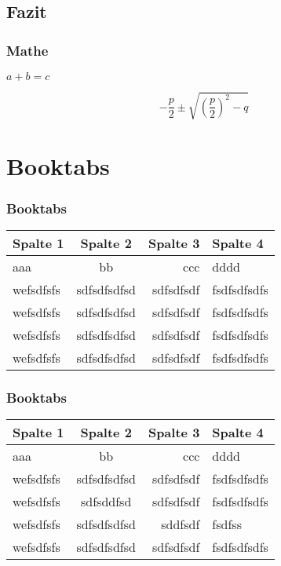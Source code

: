 \documentclass{beamer}
\begin{document}
\subsection{Fazit}

\begin{frame}
\frametitle{Mathe}

\(a+b=c\)

\[-\frac{p}{2} \pm \sqrt{ \left(\frac{p}{2}\right)^2 -q  }\]


\end{frame}

\section{Booktabs}

\begin{frame}
\frametitle{Booktabs}

\begin{tabular}{|l|c|r|p{4cm}|} \hline
Spalte 1 & Spalte 2 & Spalte 3 & Spalte 4 \\ \hline
aaa & bb & ccc & dddd \\ \hline
wefsdfsfs & sdfsdfsdfsd & sdfsdfsdf & fsdfsdfsdfs\\ \hline
wefsdfsfs & sdfsdfsdfsd & sdfsdfsdf & fsdfsdfsdfs\\ \hline
wefsdfsfs & sdfsdfsdfsd & sdfsdfsdf & fsdfsdfsdfs\\ \hline
wefsdfsfs & sdfsdfsdfsd & sdfsdfsdf & fsdfsdfsdfs\\ \hline
\end{tabular}

\end{frame}

\begin{frame}
\frametitle{Booktabs}

\begin{tabular}{lcrp{4cm}} \toprule[1.5pt]
\textbf{Spalte 1} & \textbf{Spalte 2} & \textbf{Spalte 3} & \textbf{Spalte 4} \\ \midrule
aaa & bb & ccc & dddd \\ \cmidrule[1pt](lr){1-4}
wefsdfsfs & sdfsdfsdfsd & sdfsdfsdf & fsdfsdfsdfs\\ 
wefsdfsfs & sdfsddfsd & sdfsdfsdf & fsdfsdfsdfs\\ \addlinespace[0.5em]
wefsdfsfs & sdfsdfsdfsd & sddfsdf & fsdfss\\ 
wefsdfsfs & sdfsdfsdfsd & sdfsdfsdf & fsdfsdfsdfs\\ \bottomrule[1.5pt]
\end{tabular}

\end{frame}
\end{document}
